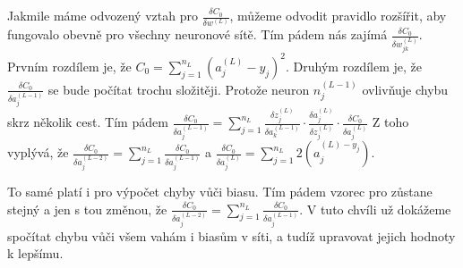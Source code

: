 Jakmile máme odvozený vztah pro \(\frac{\delta C_0}{\delta w^{(L)}}\), můžeme odvodit pravidlo rozšířit, aby fungovalo obevně pro všechny neuronové sítě.
Tím pádem nás zajímá \(\frac{\delta C_0}{\delta w_{jk}^{(L)}}\). Prvním rozdílem je, že \(C_0 = \sum_{j=1}^{n_L}(a_j^{(L)} - y_j)^2 \).
Druhým rozdílem je, že \(\frac{\delta C_0}{\delta a_j^{(L-1)}}\) se bude počítat trochu složitěji. Protože neuron \(n_j^{(L-1)}\) ovlivňuje chybu skrz několik cest.
Tím pádem \(\frac{\delta C_0}{\delta a_j^{(L-1)}} = \sum_{j=1}^{n_L} \frac{\delta z_j^{(L)}}{\delta a_k^{(L-1)}} \cdot \frac{\delta a_j^{(L)}}{\delta z_j^{(L)}} \cdot \frac{\delta C_0}{\delta a_j^(L)}\)
Z toho vyplývá, že \(\frac{\delta C_0}{\delta a_j^{(L-2)}} = \sum_{j=1}^{n_L} \frac{\delta C_0}{\delta a_j^{(L-1)}} \) a \(\frac{\delta C_0}{\delta a_j^{(L)}} = \sum_{j=1}^{n_L} 2(a_j^{(L) - y_j})\).

To samé platí i pro výpočet chyby vůči biasu. Tím pádem vzorec pro zůstane stejný a jen s tou změnou, že \(\frac{\delta C_0}{\delta a_j^{(L-2)}} = \sum_{j=1}^{n_L} \frac{\delta C_0}{\delta a_j^{(L-1)}} \).
V tuto chvíli už dokážeme spočítat chybu vůči všem vahám i biasům v síti, a tudíž upravovat jejich hodnoty k lepšímu.
\newpage